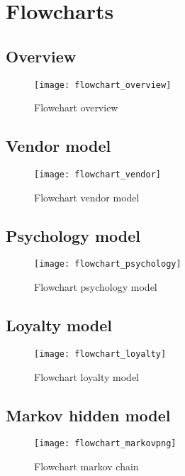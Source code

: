 
\chapter{Flowcharts}

\section{Overview}
\begin{figure}[h!]
    \begin{center}
        \texttt{[image: flowchart\_overview]}
    \end{center}
    \caption{Flowchart overview}
    \label{flowchart_overview}
\end{figure}
\newpage
\section{Vendor model}
\begin{figure}[h!]
    \begin{center}
        \texttt{[image: flowchart\_vendor]}
    \end{center}
    \caption{Flowchart vendor model}
    \label{flowchart_vendor}
\end{figure}
\section{Psychology model}
\begin{figure}[h!]
    \begin{center}
        \texttt{[image: flowchart\_psychology]}
    \end{center}
    \caption{Flowchart psychology model}
    \label{flowchart_psychology}
\end{figure}
\newpage
\section{Loyalty model}
\begin{figure}[h!]
    \begin{center}
        \texttt{[image: flowchart\_loyalty]}
    \end{center}
    \caption{Flowchart loyalty model}
    \label{flowchart_loyalty}
\end{figure}
\section{Markov hidden model}
\begin{figure}[h!]
    \begin{center}
        \texttt{[image: flowchart\_markovpng]}
    \end{center}
    \caption{Flowchart markov chain}
    \label{flowchart_markov}
\end{figure}
\newpage
